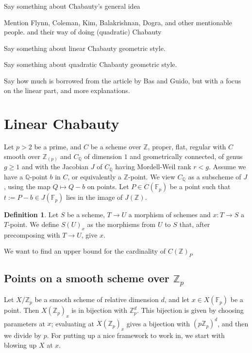\documentclass{article}
\newcommand{\Z}{\mathbb{Z}}
\newcommand{\Q}{\mathbb{Q}}
\newcommand{\F}{\mathbb{F}}
\renewcommand{\angle}[1]{\hspace{-2pt}\left\langle #1 \right\rangle}
\theoremstyle{plain}
\theoremstyle{definition}
\newtheorem{defn}[thm]{Definition} %
\theoremstyle{remark}
\begin{document}
Say something about Chabauty's general idea

Mention Flynn, Coleman, Kim, Balakrishnan, Dogra, and other mentionable people. and their way of doing (quadratic) Chabauty

Say something about linear Chabauty geometric style.

Say something about quadratic Chabauty geometric style.

Say how much is borrowed from the article by Bas and Guido, but with a focus on the linear part, and more explanations.

\newpage
\section{Linear Chabauty}
Let $p>2$ be a prime, and $C$ be a scheme over $\Z$, proper, flat, regular with $C$ smooth over $\Z_{(p)}$ and $C_\Q$ of dimension $1$ and geometrically connected, of genus $g \geq 1$ and with the Jacobian $J$ of $C_\Q$ having Mordell-Weil rank $r < g$. Assume we have a $\Q$-point $b$ in $C$, or equivalently a $\Z$-point. We view $C_\Q$ as a subscheme of $J$, using the map $Q \mapsto Q - b$ on points. Let $P \in C(\F_p)$ be a point such that $t := P - b \in J(\F_p)$ lies in the image of $J(\Z)$.

\begin{defn}
Let $S$ be a scheme, $T \to U$ a morphism of schemes and $x : T \to S$ a $T$-point. We define $S(U)_x$ as the morphisms from $U$ to $S$ that, after precomposing with $T \to U$, give $x$.
\end{defn}

We want to find an upper bound for the cardinality of $C(\Z)_P$

\subsection{Points on a smooth scheme over \texorpdfstring{$\Z_p$}{Z\_p}}
\label{subs:smoothzppoints}
Let $X/\Z_p$ be a smooth scheme of relative dimension $d$, and let $x \in X(\F_p)$ be a point. Then $X(\Z_p)_x$ is in bijection with $\Z_p^d$. This bijection is given by choosing parameters at $x$; evaluating at $X(\Z_p)_x$ gives a bijection with $(p\Z_p)^d$, and then we divide by $p$. For putting up a nice framework to work in, we start with blowing up $X$ at $x$.
\end{document}
